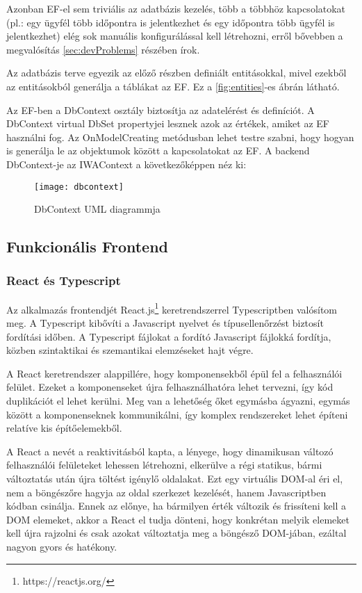 Azonban EF-el sem triviális az adatbázis kezelés, több a többhöz kapcsolatokat (pl.: egy ügyfél több időpontra is jelentkezhet és egy időpontra több ügyfél is jelentkezhet) elég sok manuális konfigurálással kell létrehozni, erről bővebben a megvalósítás \ref{sec:devProblems} részében írok.

Az adatbázis terve egyezik az előző részben definiált entitásokkal, mivel ezekből az entitásokból generálja a táblákat az EF. Ez a \ref{fig:entities}-es ábrán látható.

Az EF-ben a DbContext osztály biztosítja az adatelérést és definíciót. A DbContext virtual DbSet propertyjei lesznek azok az értékek, amiket az EF használni fog. Az OnModelCreating metódusban lehet testre szabni, hogy hogyan is generálja le az objektumok között a kapcsolatokat az EF. A backend DbContext-je az IWAContext a következőképpen néz ki:

\begin{figure}[H]
	\centering
	\texttt{[image: dbcontext]}
	\caption{DbContext UML diagrammja}
	\label{fig:dbcontext}
\end{figure}


\subsection{Funkcionális Frontend}
\subsubsection{React és Typescript}

Az alkalmazás frontendjét React.js\footnote{https://reactjs.org/} keretrendszerrel Typescriptben valósítom meg. A Typescript kibővíti a Javascript nyelvet és típusellenőrzést biztosít fordítási időben. A Typescript fájlokat a fordító Javascript fájlokká fordítja, közben szintaktikai és szemantikai elemzéseket hajt végre.

A React keretrendszer alappillére, hogy komponensekből épül fel a felhasználói felület. Ezeket a komponenseket újra felhasználhatóra lehet tervezni, így kód duplikációt el lehet kerülni. Meg van a lehetőség őket egymásba ágyazni, egymás között a komponenseknek kommunikálni, így komplex rendszereket lehet építeni relatíve kis építőelemekből.

A React a nevét a reaktivitásból kapta, a lényege, hogy dinamikusan változó felhasználói felületeket lehessen létrehozni, elkerülve a régi statikus, bármi változtatás után újra töltést igénylő oldalakat. Ezt egy virtuális DOM-al éri el, nem a böngészőre hagyja az oldal szerkezet kezelését, hanem Javascriptben kódban csinálja. Ennek az előnye, ha bármilyen érték változik és frissíteni kell a DOM elemeket, akkor a React el tudja dönteni, hogy konkrétan melyik elemeket kell újra rajzolni és csak azokat változtatja meg a böngésző DOM-jában, ezáltal nagyon gyors és hatékony.

